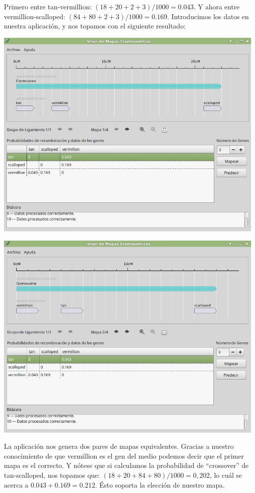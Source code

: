 \documentclass{article}
\begin{document}
	Primero entre tan-vermillion: $(18 + 20 + 2 + 3) / 1000 = 0.043$. Y ahora entre vermillion-scalloped: $(84 + 80 + 2 + 3) / 1000 = 0.169$. Introducimos los datos en nuestra aplicación, y nos topamos con el siguiente resultado:
	
	\begin{center}
		\includegraphics[scale=0.5]{images/e_6.png}
	\end{center}
	
	\begin{center}
		\includegraphics[scale=0.5]{images/e_7.png}
	\end{center}
	
	La aplicación nos genera dos pares de mapas equivalentes. Gracias a nuestro conocimiento de que vermillion es el gen del medio podemos decir que el primer mapa es el correcto. Y nótese que si calculamos la probabilidad de ``crossover'' de tan-scalloped, nos topamos que: $(18 + 20 + 84 + 80) / 1000 =  0,202$, lo cuál se acerca a $0.043 + 0.169 = 0.212$. Ésto soporta la elección de nuestro mapa.
	
\end{document}
